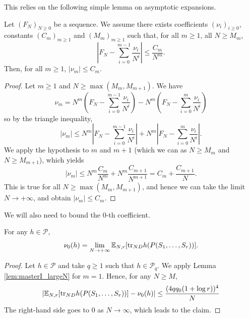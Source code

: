 This relies on the following simple lemma on asymptotic expansions.

\begin{lemma}
  \label{lem:expansion_bound}
  Let $(F_N)_{N \geq 0}$ be a sequence.
  We assume there exists coefficients $(\nu_i)_{i \geq 0}$, constants $(C_m)_{m \geq 1}$ and
  $(M_m)_{m \geq 1}$ such that, for all $m \geq 1$, all $N \geq M_m$,
  \begin{equation*}
    \left| F_N - \sum_{i=0}^{m-1} \frac{\nu_i}{N^i} \right| \leq \frac{C_m}{N^m}.
  \end{equation*}
  Then, for all $m \geq 1$, $|\nu_m| \leq C_m$.
\end{lemma}

\begin{proof}
  Let $m \geq 1$ and $N \geq \max(M_m, M_{m+1})$.
  We have
  \begin{equation*}
    \nu_m = N^m \left(F_N - \sum_{i=0}^{m-1} \frac{\nu_i}{N^i} \right)
    - N^m \left(F_N - \sum_{i=0}^{m} \frac{\nu_i}{N^i}\right)
  \end{equation*}
  so by the triangle inequality,
    \begin{equation*}
    |\nu_m| \leq N^m \left|F_N - \sum_{i=0}^{m-1} \frac{\nu_i}{N^i} \right|
    + N^m \left|F_N - \sum_{i=0}^{m} \frac{\nu_i}{N^i}\right|.
  \end{equation*}
  We apply the hypothesis to $m$ and $m+1$ (which we can as $N \geq M_m$ and $N \geq M_{m+1}$),
  which yields
  \begin{equation*}
    |\nu_m|
    \leq N^m \frac{C_m}{N^m} + N^m \frac{C_{m+1}}{N^{m+1}}
    = C_{m} + \frac{C_{m+1}}{N}.
  \end{equation*}
  This is true for all $N \geq \max(M_m,M_{m+1})$, and hence we can take the limit $N \rightarrow + \infty$,
  and obtain $|\nu_m| \leq C_m$.
\end{proof}

We will also need to bound the $0$-th coefficient.

\begin{lemma}
  \label{lem:expr_nu_0}
  For any $h \in \mathcal{P}$,
  \begin{equation*}
    \nu_0(h) = \lim_{N \rightarrow +\infty} \expec [\trN[ND] h(P(S_1, \ldots, S_r))].
  \end{equation*}
\end{lemma}

\begin{proof}
  Let $h \in \mathcal{P}$ and take $q \geq 1$ such that $h \in \mathcal{P}_q$.
  We apply Lemma \ref{lem:masterI_largeN} for $m=1$.
  Hence, for any $N \geq M$,
  \begin{equation*}
    \left|
      \expec [\trN[ND] h(P(S_1, \ldots, S_r))]
      - \nu_0(h)
    \right| \leq \frac{(4 q q_0(1+\log r))^4}{N}
  \end{equation*}
  The right-hand side goes to $0$ as $N \rightarrow \infty$, which leads to the claim.
\end{proof}

